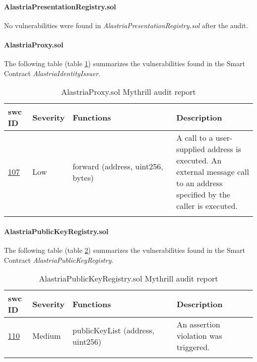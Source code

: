 \paragraph{AlastriaPresentationRegistry.sol}
No vulnerabilities were found in \textit{AlastriaPresentationRegistry.sol} after the audit.

\paragraph{AlastriaProxy.sol}
The following table (table \ref{tab:AlastriaProxy}) summarizes the vulnerabilities found in the Smart Contract \textit{AlastriaIdentityIssuer}.\newline
\begin{longtable}{||p{0.1\linewidth} | p{0.11\linewidth} | p{0.45\linewidth} | p{0.35\linewidth}||}
    \hline
    \textbf{\acrshort{swc} ID}                      & \textbf{Severity} & \textbf{Functions}                & \textbf{Description}                                                                                                       \\ [0.5ex]
    \hline\hline
    \href{https://swcregistry.io/docs/SWC-107}{107} & Low               & forward (address, uint256, bytes) & A call to a user-supplied address is executed. An external message call to an address specified by the caller is executed. \\ [1ex]
    \hline
    \caption{AlastriaProxy.sol Mythrill audit report}
    \label{tab:AlastriaProxy}
\end{longtable}

\paragraph{AlastriaPublicKeyRegistry.sol}
The following table (table \ref{tab:AlastriaPublicKeyRegistry}) summarizes the vulnerabilities found in the Smart Contract \textit{AlastriaPublicKeyRegistry}.
\begin{longtable}{||p{0.1\linewidth} | p{0.11\linewidth} | p{0.45\linewidth} | p{0.35\linewidth}||}
    \hline
    \textbf{\acrshort{swc} ID}                      & \textbf{Severity} & \textbf{Functions}               & \textbf{Description}                  \\ [0.5ex]
    \hline\hline
    \href{https://swcregistry.io/docs/SWC-110}{110} & Medium            & publicKeyList (address, uint256) & An assertion violation was triggered. \\ [1ex]
    \hline
    \caption{AlastriaPublicKeyRegistry.sol Mythrill audit report}
    \label{tab:AlastriaPublicKeyRegistry}
\end{longtable}


